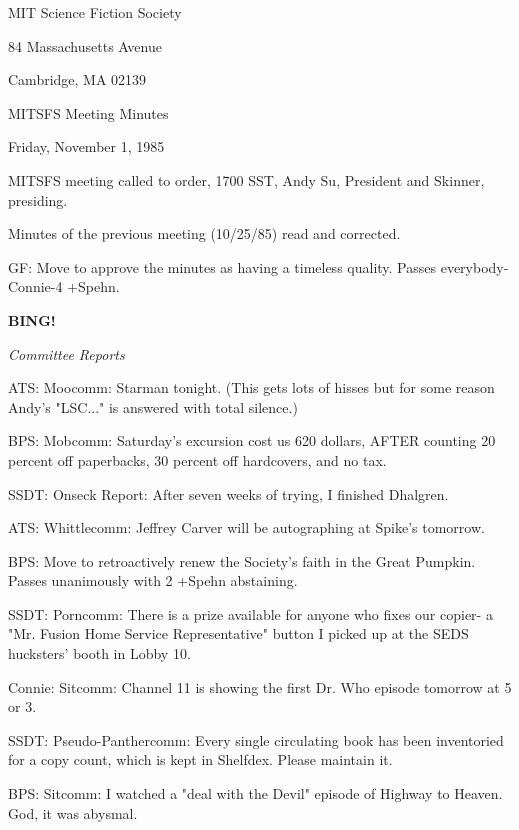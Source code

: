 \documentclass[12pt]{article}
\newcommand{\bing}{{\bf BING!} }
\newcommand{\goto}[1]{\bing \vskip 12pt \centerline{{\em{#1}}}}
\begin{document}
\begin{center}

MIT Science Fiction Society 

84 Massachusetts Avenue

Cambridge, MA 02139

\vspace{12pt}

MITSFS Meeting Minutes 

Friday, November 1, 1985

\end{center}
 
\vspace{18pt}

\setlength{\parskip}{6pt}

\noindent
MITSFS meeting called to order, 1700 SST,
Andy Su, President and Skinner, presiding.

Minutes of the previous meeting (10/25/85) read and corrected.

GF: Move to approve the minutes as having a timeless quality. Passes everybody-Connie-4 +Spehn.

\goto{Committee Reports}

ATS: Moocomm: Starman tonight. (This gets lots of hisses but for some reason Andy's "LSC..." is answered with total silence.)

BPS: Mobcomm: Saturday's excursion cost us 620 dollars, AFTER counting 20 percent off paperbacks, 30 percent off hardcovers, and no tax.

SSDT: Onseck Report: After seven weeks of trying, I finished Dhalgren.

ATS: Whittlecomm: Jeffrey Carver will be autographing at Spike's tomorrow.

BPS: Move to retroactively renew the Society's faith in the Great Pumpkin. Passes unanimously with 2 +Spehn abstaining.

SSDT: Porncomm: There is a prize available for anyone who fixes our copier- a "Mr. Fusion Home Service Representative" button I picked up at the SEDS hucksters' booth in Lobby 10.

Connie: Sitcomm: Channel 11 is showing the first Dr. Who episode tomorrow at 5 or 3.

SSDT: Pseudo-Panthercomm: Every single circulating book has been inventoried for a copy count, which is kept in Shelfdex. Please maintain it.

BPS: Sitcomm: I watched a "deal with the Devil" episode of Highway to Heaven. God, it was abysmal.
\end{document}
